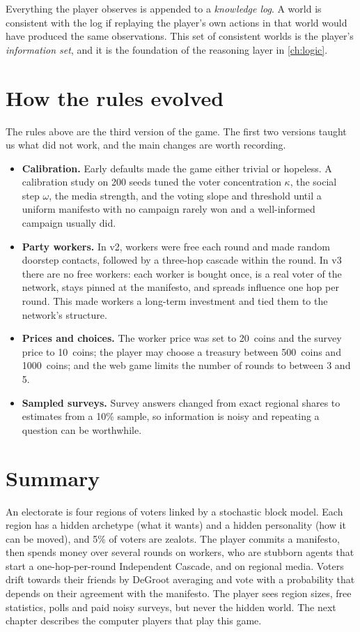\documentclass[11pt,a4paper,oneside]{report}
\newcommand{\coins}[1]{#1~coins}
\newcommand{\summarysection}{\section{Summary}}
\begin{document}
Everything the player observes is appended to a \emph{knowledge log}. A world is consistent with the log
if replaying the player's own actions in that world would have produced the same observations. This set of
consistent worlds is the player's \emph{information set}, and it is the foundation of the reasoning layer
in \cref{ch:logic}.

\section{How the rules evolved}

The rules above are the third version of the game. The first two versions taught us what did not work, and
the main changes are worth recording.
\begin{itemize}
  \item \textbf{Calibration.} Early defaults made the game either trivial or hopeless. A calibration study
        on 200 seeds tuned the voter concentration $\kappa$, the social step $\omega$, the media strength,
        and the voting slope and threshold until a uniform manifesto with no campaign rarely won and a
        well-informed campaign usually did.
  \item \textbf{Party workers.} In v2, workers were free each round and made random doorstep contacts,
        followed by a three-hop cascade within the round. In v3 there are no free workers: each worker is
        bought once, is a real voter of the network, stays pinned at the manifesto, and spreads influence
        one hop per round. This made workers a long-term investment and tied them to the network's
        structure.
  \item \textbf{Prices and choices.} The worker price was set to \coins{20} and the survey price to
        \coins{10}; the player may choose a treasury between \coins{500} and \coins{1000}; and the web
        game limits the number of rounds to between 3 and 5.
  \item \textbf{Sampled surveys.} Survey answers changed from exact regional shares to estimates from a
        10\% sample, so information is noisy and repeating a question can be worthwhile.
\end{itemize}

\summarysection

An electorate is four regions of voters linked by a stochastic block model. Each region has a hidden
archetype (what it wants) and a hidden personality (how it can be moved), and 5\% of voters are zealots.
The player commits a manifesto, then spends money over several rounds on workers, who are stubborn agents
that start a one-hop-per-round Independent Cascade, and on regional media. Voters drift towards their
friends by DeGroot averaging and vote with a probability that depends on their agreement with the
manifesto. The player sees region sizes, free statistics, polls and paid noisy surveys, but never the
hidden world. The next chapter describes the computer players that play this game.
\end{document}
